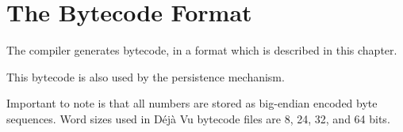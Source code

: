 \chapter{The Bytecode Format}

The compiler generates bytecode, in a format which is described in this
chapter.

This bytecode is also used by the persistence mechanism.

Important to note is that all numbers are stored as big-endian encoded byte sequences. Word sizes used in Déjà Vu bytecode files are 8, 24, 32, and 64 bits.




